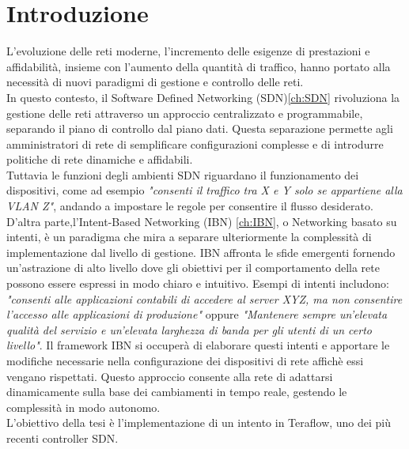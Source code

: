 \chapter{Introduzione}
L'evoluzione delle reti moderne, l'incremento delle esigenze di prestazioni e affidabilità, insieme con l'aumento della quantità di traffico, 
hanno portato alla necessità di nuovi paradigmi di gestione e controllo delle reti.
\\In questo contesto, il Software Defined Networking (SDN)\ref{ch:SDN} rivoluziona la gestione delle reti attraverso un approccio centralizzato e programmabile, separando il piano di controllo dal piano dati.
Questa separazione permette agli amministratori di rete di semplificare configurazioni complesse e di introdurre politiche di rete dinamiche e affidabili.
\\Tuttavia le funzioni degli ambienti SDN riguardano il funzionamento dei dispositivi, come ad esempio \textit{"consenti il traffico tra X e Y solo se appartiene alla VLAN Z"}, andando a impostare
le regole per consentire il flusso desiderato.
\\D'altra parte,l’Intent-Based Networking (IBN) \ref{ch:IBN}, o Networking basato su intenti, è un paradigma che mira a separare ulteriormente la complessità di implementazione dal livello di gestione. 
IBN affronta le sfide emergenti fornendo un'astrazione di alto livello dove gli obiettivi per il comportamento della rete possono essere espressi in modo chiaro e intuitivo.
Esempi di intenti includono: \textit{"consenti alle applicazioni contabili di accedere al server XYZ, ma non consentire l’accesso alle applicazioni di produzione"} oppure
\textit{"Mantenere sempre un'elevata qualità del servizio e un'elevata larghezza di banda per gli utenti di un certo livello"}.
Il framework IBN si occuperà di elaborare questi intenti e apportare le modifiche necessarie nella configurazione dei dispositivi di rete affichè essi vengano rispettati. 
Questo approccio consente alla rete di adattarsi dinamicamente sulla base dei cambiamenti in tempo reale, gestendo le complessità in modo autonomo.
\\L'obiettivo della tesi è l'implementazione di un intento in Teraflow, uno dei più recenti controller SDN.

